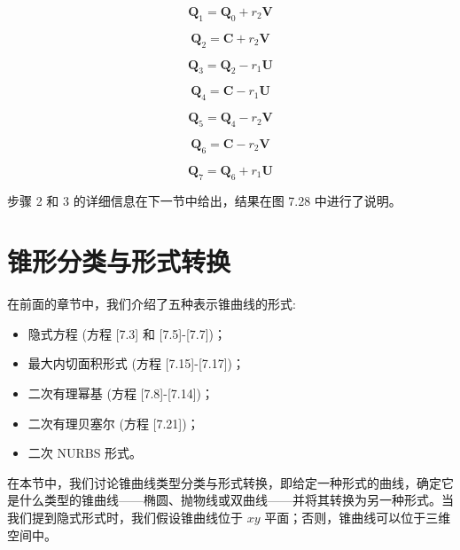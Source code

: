 \documentclass[../main.tex]{subfiles}
\begin{document}
\[
{\mathbf{Q}}_{1} = {\mathbf{Q}}_{0} + {r}_{2}\mathbf{V}
\]

\[
{\mathbf{Q}}_{2} = \mathbf{C} + {r}_{2}\mathbf{V}
\]

\[
{\mathbf{Q}}_{3} = {\mathbf{Q}}_{2} - {r}_{1}\mathbf{U}
\]

\[
{\mathbf{Q}}_{4} = \mathbf{C} - {r}_{1}\mathbf{U}
\]

\[
{\mathbf{Q}}_{5} = {\mathbf{Q}}_{4} - {r}_{2}\mathbf{V}
\]

\[
{\mathbf{Q}}_{6} = \mathbf{C} - {r}_{2}\mathbf{V}
\]

\[
{\mathbf{Q}}_{7} = {\mathbf{Q}}_{6} + {r}_{1}\mathbf{U}
\]

步骤 2 和 3 的详细信息在下一节中给出，结果在图 7.28 中进行了说明。



\section{锥形分类与形式转换}

在前面的章节中，我们介绍了五种表示锥曲线的形式:

\begin{itemize}
\item 隐式方程 (方程 [7.3] 和 [7.5]-[7.7])；
\end{itemize}

\begin{itemize}
\item 最大内切面积形式 (方程 [7.15]-[7.17])；
\end{itemize}

\begin{itemize}
\item 二次有理幂基 (方程 [7.8]-[7.14])；
\end{itemize}

\begin{itemize}
\item 二次有理贝塞尔 (方程 [7.21])；
\end{itemize}

\begin{itemize}
\item 二次 NURBS 形式。
\end{itemize}

在本节中，我们讨论锥曲线类型分类与形式转换，即给定一种形式的曲线，确定它是什么类型的锥曲线——椭圆、抛物线或双曲线——并将其转换为另一种形式。当我们提到隐式形式时，我们假设锥曲线位于 \({xy}\) 平面；否则，锥曲线可以位于三维空间中。
\end{document}

